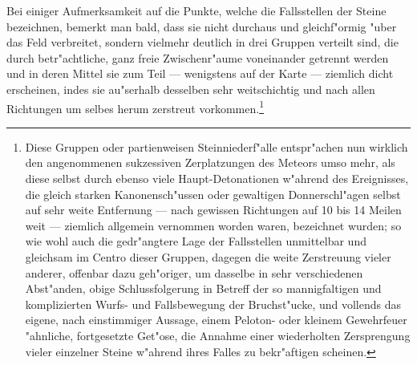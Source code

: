 \documentclass[a4paper, 11pt, oneside, german]{article}
\begin{document}
Bei einiger Aufmerksamkeit auf die Punkte, welche die Fallsstellen der Steine bezeichnen, bemerkt man bald, dass sie nicht durchaus und gleichf"ormig "uber das Feld verbreitet, sondern vielmehr deutlich in drei Gruppen verteilt sind, die durch betr"achtliche, ganz freie Zwischenr"aume voneinander getrennt werden und in deren Mittel sie zum Teil --- wenigstens auf der Karte --- ziemlich dicht erscheinen, indes sie au"serhalb desselben sehr weitschichtig und nach allen Richtungen um selbes herum zerstreut vorkommen.\footnote{Diese Gruppen oder partienweisen Steinniederf"alle entspr"achen nun wirklich den angenommenen sukzessiven Zerplatzungen des Meteors umso mehr, als diese selbst durch ebenso viele Haupt-Detonationen w"ahrend des Ereignisses, die gleich starken Kanonensch"ussen oder gewaltigen Donnerschl"agen selbst auf sehr weite Entfernung --- nach gewissen Richtungen auf 10 bis 14 Meilen weit --- ziemlich allgemein vernommen worden waren, bezeichnet wurden; so wie wohl auch die gedr"angtere Lage der Fallsstellen unmittelbar und gleichsam im Centro dieser Gruppen, dagegen die weite Zerstreuung vieler anderer, offenbar dazu geh"origer, um dasselbe in sehr verschiedenen Abst"anden, obige Schlussfolgerung in Betreff der so mannigfaltigen und komplizierten Wurfs- und Fallsbewegung der Bruchst"ucke, und vollends das eigene, nach einstimmiger Aussage, einem Peloton- oder kleinem Gewehrfeuer "ahnliche, fortgesetzte Get"ose, die Annahme einer wiederholten Zersprengung vieler einzelner Steine w"ahrend ihres Falles zu bekr"aftigen scheinen.}
\end{document}
